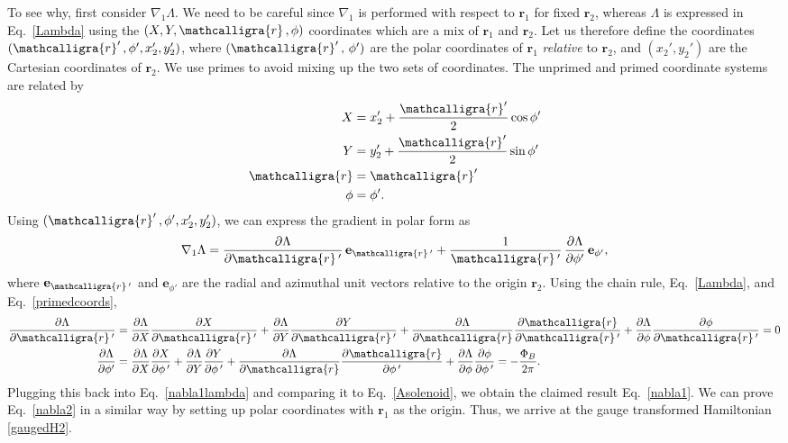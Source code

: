 \documentclass[pra,12pt]{revtex4}
\begin{document}
To see why, first consider $\nabla_1\Lambda$.  We need to be careful
since $\nabla_1$ is performed with respect to $\mathbf{r}_1$ for fixed
$\mathbf{r}_2$, whereas $\Lambda$ is expressed in Eq.~\eqref{Lambda}
using the $(X, Y, \mathcalligra{r}\,, \phi)$ coordinates which are a
mix of $\mathbf{r}_1$ and $\mathbf{r}_2$.  Let us therefore define the
coordinates $(\mathcalligra{r}'\,, \phi', x_2', y_2')$, where
$(\mathcalligra{r}'\,,\,\phi')$ are the polar coordinates of
$\mathbf{r}_1$ \textit{relative} to $\mathbf{r}_2$, and $(x_2', y_2')$
are the Cartesian coordinates of $\mathbf{r}_2$.  We use primes to
avoid mixing up the two sets of coordinates.  The unprimed and primed
coordinate systems are related by
\begin{align}
  \begin{aligned}
    X &= x_2' + \frac{\mathcalligra{r}'}{2} \cos\phi' \\
    Y &= y_2' + \frac{\mathcalligra{r}'}{2} \sin\phi' \\
    \mathcalligra{r} &= \mathcalligra{r}' \\
    \phi &= \phi'.
  \end{aligned}
  \label{primedcoords}
\end{align}
Using $(\mathcalligra{r}'\,, \phi', x_2', y_2')$, we can express the
gradient in polar form as
\begin{equation}
  \nabla_1\Lambda =  \frac{\partial
    \Lambda}{\partial \mathcalligra{r}\,'} \, \mathbf{e}_{\mathcalligra{r}\,'}
  + \frac{1}{\mathcalligra{r}\,'} \,\frac{\partial \Lambda}{\partial \phi'}
  \, \mathbf{e}_{\phi'},
  \label{nabla1lambda}
\end{equation}
where $\mathbf{e}_{\mathcalligra{r}\,'}$ and $\mathbf{e}_{\phi'}$ are
the radial and azimuthal unit vectors relative to the origin
$\mathbf{r}_2$.  Using the chain rule, Eq.~\eqref{Lambda}, and
Eq.~\eqref{primedcoords},
\begin{align}
  \frac{\partial\Lambda}{\partial \mathcalligra{r}\,'} &=
  \frac{\partial\Lambda}{\partial X}
  \frac{\partial X}{\partial \mathcalligra{r}\,'}
  +
  \frac{\partial\Lambda}{\partial Y}
  \frac{\partial Y}{\partial \mathcalligra{r}\,'}
  +
  \frac{\partial\Lambda}{\partial \mathcalligra{r}}
  \frac{\partial\mathcalligra{r}}{\partial \mathcalligra{r}\,'}
  +
  \frac{\partial\Lambda}{\partial \phi}
  \frac{\partial\phi}{\partial \mathcalligra{r}\,'} = 0 \\
  \frac{\partial\Lambda}{\partial \phi'} &=
  \frac{\partial\Lambda}{\partial X}
  \frac{\partial X}{\partial \phi\,'}
  +
  \frac{\partial\Lambda}{\partial Y}
  \frac{\partial Y}{\partial \phi\,'}
  +
  \frac{\partial\Lambda}{\partial \mathcalligra{r}}
  \frac{\partial\mathcalligra{r}}{\partial \phi\,'}
  +
  \frac{\partial\Lambda}{\partial \phi}
  \frac{\partial\phi}{\partial \phi\,'} = 
  -\frac{\Phi_B}{2\pi}.
\end{align}
Plugging this back into Eq.~\eqref{nabla1lambda} and comparing it to
Eq.~\eqref{Asolenoid}, we obtain the claimed result
Eq.~\eqref{nabla1}.  We can prove Eq.~\eqref{nabla2} in a similar way
by setting up polar coordinates with $\mathbf{r}_1$ as the origin.
Thus, we arrive at the gauge transformed Hamiltonian \eqref{gaugedH2}.
\end{document}
